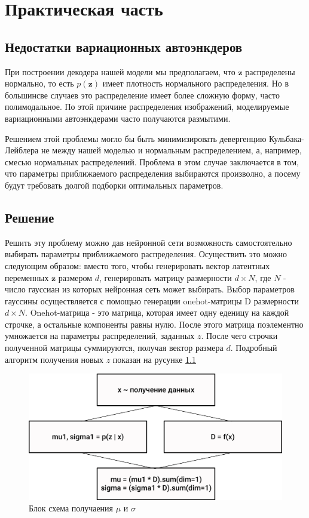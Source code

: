 \documentclass[a4paper]{report}
\begin{document}
\chapter{Практическая часть}

\section{Недостатки вариационных автоэнкдеров}

При построении декодера нашей модели мы предполагаем, что $\mathbf{z}$ распределены нормально, то есть $p(\mathbf{z})$ имеет плотность нормального
распределения. Но в большинсве случаев это распределение имеет более сложную форму, часто полимодальное. По этой причине распределения изображений,
моделируемые вариационными автоэнкдерами часто получаются размытими.

Решением этой проблемы могло бы быть минимизировать девергенцию Кульбака-Лейблера не между нашей моделью и нормальным распределением, а, например,
смесью нормальных распределений. Проблема в этом случае заключается в том, что параметры приближаемого распределения выбираются произволно, а посему
будут требовать долгой подборки оптимальных параметров.

\section{Решение} \label{solution}

Решить эту проблему можно дав нейронной сети возможность самостоятельно выбирать параметры приближаемого распределения. Осуществить это можно
следующим образом: вместо того, чтобы генерировать вектор латентных переменных $\mathbf{z}$ размером $d$, генерировать матрицу размерности $d \times N$, где
$N$ - число гауссиан из которых нейронная сеть может выбирать. Выбор параметров гауссины осуществляется с помощью генерации onehot-матрицы D размерности 
$d \times N$. Onehot-матрица - это матрица, которая имеет одну еденицу на каждой строчке, а остальные компоненты равны нулю. После этого матрица поэлементно умножается
на параметры распределений, заданных $z$. После чего строчки полученной матрицы суммируются, получая вектор размера $d$. Подробный алгоритм получения
новых $z$ показан на русунке \ref{fig:musigma}

\begin{figure}[H]
  \includegraphics[width=\linewidth]{block-diagram.png}
  \caption{Блок схема получаения $\mu$ и $\sigma$}
  \label{fig:musigma}
\end{figure}
\end{document}
